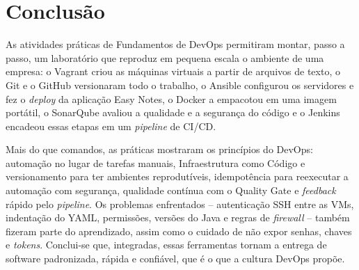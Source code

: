 \section{Conclusão}\label{sec:conclusao}

As atividades práticas de Fundamentos de DevOps permitiram montar, passo a passo, um laboratório que
reproduz em pequena escala o ambiente de uma empresa: o Vagrant criou as máquinas virtuais a partir de
arquivos de texto, o Git e o GitHub versionaram todo o trabalho, o Ansible configurou os servidores e
fez o \textit{deploy} da aplicação Easy Notes, o Docker a empacotou em uma imagem portátil, o
SonarQube avaliou a qualidade e a segurança do código e o Jenkins encadeou essas etapas em um
\textit{pipeline} de CI/CD.

Mais do que comandos, as práticas mostraram os princípios do DevOps: automação no lugar de tarefas
manuais, Infraestrutura como Código e versionamento para ter ambientes reprodutíveis, idempotência
para reexecutar a automação com segurança, qualidade contínua com o Quality Gate e \textit{feedback}
rápido pelo \textit{pipeline}. Os problemas enfrentados -- autenticação SSH entre as VMs, indentação
do YAML, permissões, versões do Java e regras de \textit{firewall} -- também fizeram parte do
aprendizado, assim como o cuidado de não expor senhas, chaves e \textit{tokens}. Conclui-se que,
integradas, essas ferramentas tornam a entrega de software padronizada, rápida e confiável, que é o
que a cultura DevOps propõe.
